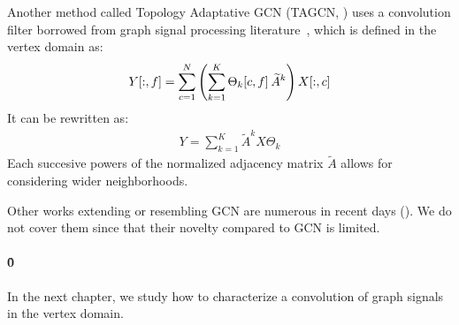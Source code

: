 Another method called Topology Adaptative GCN (TAGCN, \cite{du2017topology}) uses a convolution filter borrowed from graph signal processing literature~\citep{sandryhaila2013discrete}, which is defined in the vertex domain as:
\begin{gather}
Y[:,f] = \sum_{c = 1}^N \left(\sum_{k=1}^K \Theta_k[c,f] \h{2} \widetilde{A}^k \right) X[:,c]
\end{gather}
It can be rewritten as:
\begin{gather}
Y = \sum_{k=1}^K \widetilde{A}^k X \Theta_k
\end{gather}
Each succesive powers of the normalized adjacency matrix $\widetilde{A}$ allows for considering wider neighborhoods.

Other works extending or resembling GCN are numerous in recent days (\eg \cite{niepert2018towards}). We do not cover them since that their novelty compared to GCN is limited.

\paragraph{\h{0}}
In the next chapter, we study how to characterize a convolution of graph signals in the vertex domain.
